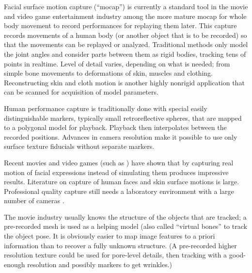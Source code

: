 Facial surface motion capture (``mocap'') is currently a standard tool in the movie and video game entertainment industry among the more mature mocap for whole body movement to record performances for replaying them later.
This capture records movements of a human body (or another object that is to be recorded) so that the movements can be replayed or analyzed. Traditional methods only model the joint angles and consider parts between them as rigid bodies, tracking tens of points in realtime. \cite{todo}
Level of detail varies, depending on what is needed; from simple bone movements to deformations of skin, muscles and clothing.
Reconstructing skin and cloth motion is another highly nonrigid application that can be scanned for acquisition of model parameters. \cite{pritchard2003cloth}

Human performance capture is traditionally done with special easily distinguishable markers, typically small retroreflective spheres, that are mapped to a polygonal model for playback.
Playback then interpolates between the recorded positions.
Advances in camera resolution make it possible to use only surface texture fiducials without separate markers.



Recent movies and video games (such as \cite{rockstar2011noire}) have shown that by capturing real motion of facial expressions instead of simulating them produces impressive results.
Literature on capture of human faces and skin surface motions is large. \cite{deng2007computer}
Professional quality capture still needs a laboratory environment with a large number of cameras \cite{winder2008technical,motionscan}.

The movie industry usually knows the structure of the objects that are tracked; a pre-recorded mesh is used as a helping model (also called ``virtual bones'' to track the object pose. \cite{todo} %
It is obviously easier to map image features to a priori information than to recover a fully unknown structure.
(A pre-recorded higher resolution texture could be used for pore-level details, then tracking with a good-enough resolution and possibly markers to get wrinkles.)

